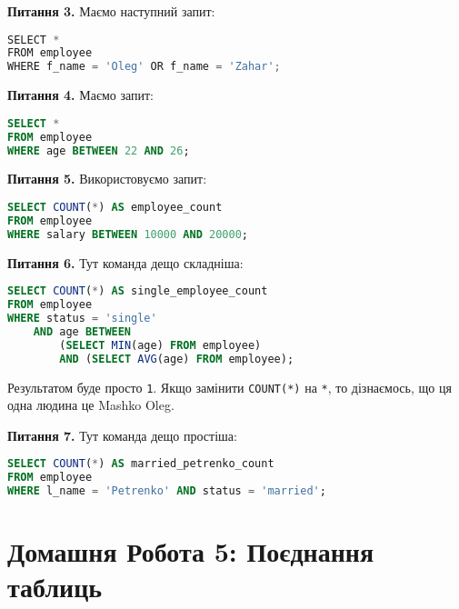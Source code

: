 \documentclass{hw_template}
\begin{document}
\textbf{Питання 3.} Маємо наступний запит:
\begin{lstlisting}[language=Python]
SELECT *
FROM employee
WHERE f_name = 'Oleg' OR f_name = 'Zahar';
\end{lstlisting}

\textbf{Питання 4.} Маємо запит:
\begin{lstlisting}[language=SQL]
SELECT *
FROM employee
WHERE age BETWEEN 22 AND 26;
\end{lstlisting}

\textbf{Питання 5.} Використовуємо запит:
\begin{lstlisting}[language=SQL]
SELECT COUNT(*) AS employee_count
FROM employee
WHERE salary BETWEEN 10000 AND 20000;
\end{lstlisting}

\textbf{Питання 6.} Тут команда дещо складніша:
\begin{lstlisting}[language=SQL]
SELECT COUNT(*) AS single_employee_count
FROM employee
WHERE status = 'single'
    AND age BETWEEN 
        (SELECT MIN(age) FROM employee) 
        AND (SELECT AVG(age) FROM employee);
\end{lstlisting}

Результатом буде просто \texttt{1}. Якщо замінити \texttt{COUNT(*)} на \texttt{*}, то
дізнаємось, що ця одна людина це Mashko Oleg.

\textbf{Питання 7.} Тут команда дещо простіша:
\begin{lstlisting}[language=SQL]
SELECT COUNT(*) AS married_petrenko_count
FROM employee
WHERE l_name = 'Petrenko' AND status = 'married';
\end{lstlisting}

\newpage

\section{Домашня Робота 5: Поєднання таблиць}
\end{document}
